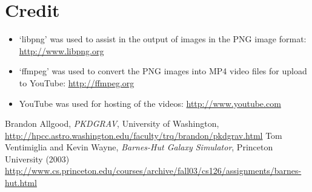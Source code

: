 \documentclass[11pt]{article}
\begin{document}
\section{Credit}
\begin{itemize}
\item `libpng' was used to assist in the output of images in the PNG image format: \url{http://www.libpng.org}
\item `ffmpeg' was used to convert the PNG images into MP4 video files for upload to YouTube: \url{http://ffmpeg.org}
\item YouTube was used for hosting of the videos: \url{http://www.youtube.com}
\end{itemize}

\begin{thebibliography}{9}
		Brandon Allgood, \emph{PKDGRAV}, University of Washington, \url{http://hpcc.astro.washington.edu/faculty/trq/brandon/pkdgrav.html}
		Tom Ventimiglia and Kevin Wayne, \emph{Barnes-Hut Galaxy Simulator}, Princeton University (2003) \url{http://www.cs.princeton.edu/courses/archive/fall03/cs126/assignments/barnes-hut.html}
\end{thebibliography}
\end{document}
